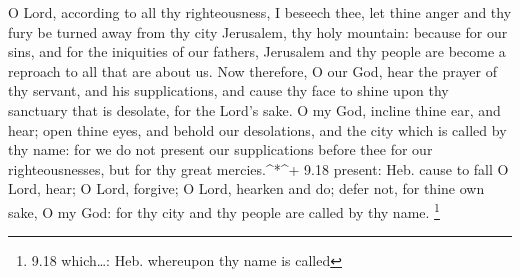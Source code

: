  O Lord, according to all thy righteousness, I beseech
thee, let thine anger and thy fury be turned away from thy city
Jerusalem, thy holy mountain: because for our sins, and for the
iniquities of our fathers, Jerusalem and thy people are become a
reproach to all that are about us.  Now therefore, O our
God, hear the prayer of thy servant, and his supplications, and cause
thy face to shine upon thy sanctuary that is desolate, for the Lord's
sake.  O my God, incline thine ear, and hear; open thine
eyes, and behold our desolations, and the city which is called by thy
name: for we do not present our supplications before thee for our
righteousnesses, but for thy great mercies.\^{}*\^{}+ 9.18 present: Heb.
cause to fall  O Lord, hear; O Lord, forgive; O Lord,
hearken and do; defer not, for thine own sake, O my God: for thy city
and thy people are called by thy name. \footnote{9.18 which\ldots: Heb.
  whereupon thy name is called}

